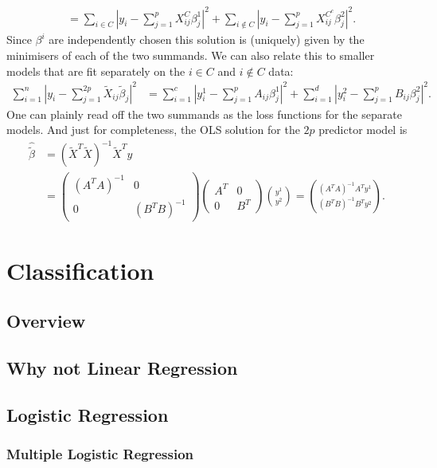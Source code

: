 \documentclass[11pt]{article}
\theoremstyle{definition}
\begin{document}
\begin{itemize}
\begin{align}
        &= \sum_{i\in C} \left|y_i -  \sum_{j=1}^{p} X^C_{ij}  \beta^1_j \right|^2  + \sum_{i\not\in C} \left|y_i -  \sum_{j=1}^{p} X_{ij}^{C^c} \beta^2_j \right|^2.
    \end{align}
    Since $\beta^i$ are independently chosen this solution is (uniquely) given by the minimisers of each of the two summands. We can also relate this to smaller models that are fit separately on the $i\in C$ and $i\not\in C$ data:
        \begin{align}
        \sum_{i=1}^{n} \left|y_i -  \sum_{j=1}^{2p}\tilde X_{ij} \tilde \beta_j \right|^2 
        &= \sum_{i=1}^c \left|y_i^1 -  \sum_{j=1}^{p} A_{ij} \beta_j^1 \right|^2 + \sum_{i=1}^d \left|y_i^2 -  \sum_{j=1}^{p} B_{ij} \beta_j^2 \right|^2.
        \end{align}
    One can plainly read off the two summands as the loss functions for the separate models. And just for completeness, the OLS solution for the $2p$ predictor model is 
    \begin{align}
      \hat{\tilde \beta} &=   (\tilde X^T \tilde X)^{-1} \tilde X^Ty \\
      &= \begin{pmatrix}
          (A^TA)^{-1} & 0 \\ 
          0 & (B^TB)^{-1}
      \end{pmatrix}
      \begin{pmatrix}
          A^T & 0 \\ 0 & B^T 
      \end{pmatrix} \binom{y^1}{y^2} = \binom{(A^TA)^{-1} A^T y^1 }{(B^T B)^{-1} B^T y^2}.
    \end{align}
\end{itemize}

    
\section{Classification}
\subsection{Overview}
\subsection{Why not Linear Regression}
\subsection{Logistic Regression}
\subsubsection{Multiple Logistic Regression}
\end{document}
